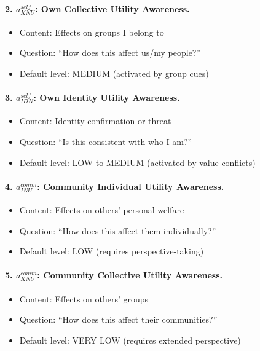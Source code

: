 \paragraph{2. $a^{self}_{KNU}$: Own Collective Utility Awareness.}
\begin{itemize}
\item Content: Effects on groups I belong to
\item Question: ``How does this affect us/my people?''
\item Default level: MEDIUM (activated by group cues)
\end{itemize}

\paragraph{3. $a^{self}_{IDN}$: Own Identity Utility Awareness.}
\begin{itemize}
\item Content: Identity confirmation or threat
\item Question: ``Is this consistent with who I am?''
\item Default level: LOW to MEDIUM (activated by value conflicts)
\end{itemize}

\paragraph{4. $a^{comm}_{INU}$: Community Individual Utility Awareness.}
\begin{itemize}
\item Content: Effects on others' personal welfare
\item Question: ``How does this affect them individually?''
\item Default level: LOW (requires perspective-taking)
\end{itemize}

\paragraph{5. $a^{comm}_{KNU}$: Community Collective Utility Awareness.}
\begin{itemize}
\item Content: Effects on others' groups
\item Question: ``How does this affect their communities?''
\item Default level: VERY LOW (requires extended perspective)
\end{itemize}

